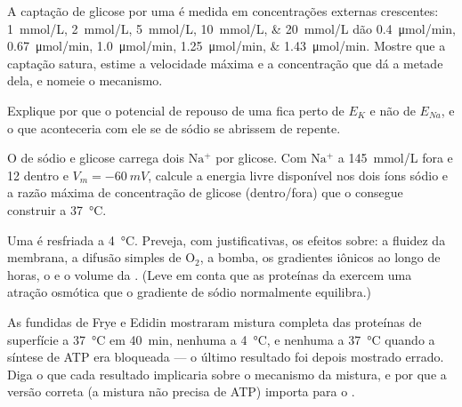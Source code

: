 \begin{exercise}[$\star\star$]\label{exo:b1:membranes-transport:7}
A captação de glicose por uma  é medida em concentrações externas
crescentes: \qtylist{1;2;5;10;20}{mmol/L} dão
\qtylist{0.4;0.67;1.0;1.25;1.43}{\micro mol/min}. Mostre que a captação
satura, estime a velocidade máxima e a concentração que dá a metade
dela, e nomeie o mecanismo.
\end{exercise}

\begin{exercise}[$\star\star$]\label{exo:b1:membranes-transport:8}
Explique por que o potencial de repouso de uma  fica perto de
$E_K$ e não de $E_{Na}$, e o que aconteceria com ele se  de sódio
se abrissem de repente.
\end{exercise}

\begin{exercise}[$\star\star$]\label{exo:b1:membranes-transport:9}
O  de sódio e glicose carrega dois $\mathrm{Na^+}$ por
glicose. Com $\mathrm{Na^+}$ a \qty{145}{mmol/L} fora e \qty{12}{}
dentro e $V_m = \qty{-60}{mV}$, calcule a energia livre disponível nos
dois íons sódio e a razão máxima de concentração de glicose
(dentro/fora) que o  consegue construir a \qty{37}{\celsius}.
\end{exercise}

\begin{exercise}[$\star\star\star$]\label{exo:b1:membranes-transport:10}
Uma  é resfriada a \qty{4}{\celsius}. Preveja, com justificativas,
os efeitos sobre: a fluidez da membrana, a difusão simples de
$\mathrm{O_2}$, a bomba, os gradientes iônicos ao longo de horas, o
 e o volume da . (Leve em conta que as
proteínas da  exercem uma atração osmótica que o gradiente de
sódio normalmente equilibra.)
\end{exercise}

\begin{exercise}[$\star\star\star$]\label{exo:b1:membranes-transport:11}
As  fundidas de Frye e Edidin mostraram mistura completa das
proteínas de superfície a \qty{37}{\celsius} em \qty{40}{min}, nenhuma a
\qty{4}{\celsius}, e nenhuma a \qty{37}{\celsius} quando a síntese de ATP
era bloqueada --- o último resultado foi depois mostrado errado. Diga o
que cada resultado implicaria sobre o mecanismo da mistura, e por que a
versão correta (a mistura não precisa de ATP) importa para o .
\end{exercise}

